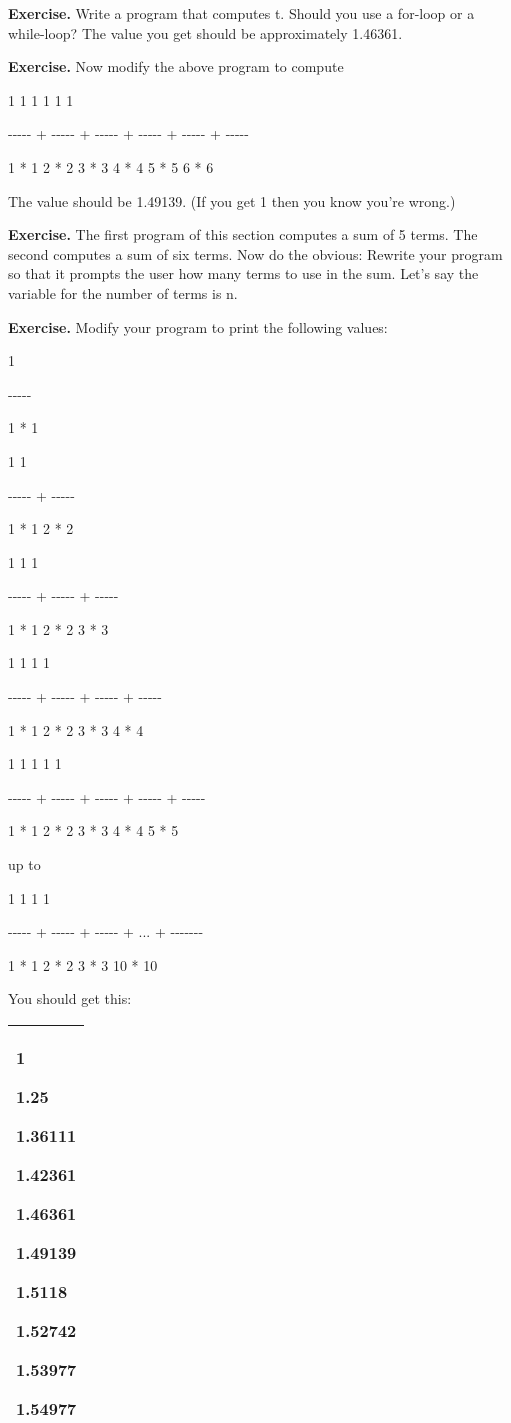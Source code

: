 \documentclass[
]{article}
\begin{document}
\textbf{Exercise.} Write a program that computes t. Should you use a
for-loop or a while-loop? The value you get should be approximately
1.46361.

\textbf{Exercise.} Now modify the above program to compute

1 1 1 1 1 1

-\/-\/-\/-\/- + -\/-\/-\/-\/- + -\/-\/-\/-\/- + -\/-\/-\/-\/- +
-\/-\/-\/-\/- + -\/-\/-\/-\/-

1 * 1 2 * 2 3 * 3 4 * 4 5 * 5 6 * 6

The value should be 1.49139. (If you get 1 then you know you're wrong.)

\textbf{Exercise.} The first program of this section computes a sum of 5
terms. The second computes a sum of six terms. Now do the obvious:
Rewrite your program so that it prompts the user how many terms to use
in the sum. Let's say the variable for the number of terms is n.

\textbf{Exercise.} Modify your program to print the following values:

1

-\/-\/-\/-\/-

1 * 1

1 1

-\/-\/-\/-\/- + -\/-\/-\/-\/-

1 * 1 2 * 2

1 1 1

-\/-\/-\/-\/- + -\/-\/-\/-\/- + -\/-\/-\/-\/-

1 * 1 2 * 2 3 * 3

1 1 1 1

-\/-\/-\/-\/- + -\/-\/-\/-\/- + -\/-\/-\/-\/- + -\/-\/-\/-\/-

1 * 1 2 * 2 3 * 3 4 * 4

1 1 1 1 1

-\/-\/-\/-\/- + -\/-\/-\/-\/- + -\/-\/-\/-\/- + -\/-\/-\/-\/- +
-\/-\/-\/-\/-

1 * 1 2 * 2 3 * 3 4 * 4 5 * 5

up to

1 1 1 1

-\/-\/-\/-\/- + -\/-\/-\/-\/- + -\/-\/-\/-\/- + ... +
-\/-\/-\/-\/-\/-\/-

1 * 1 2 * 2 3 * 3 10 * 10

You should get this:

\begin{longtable}[]{@{}l@{}}
\toprule
\endhead
\begin{minipage}[t]{0.97\columnwidth}\raggedright
1

1.25

1.36111

1.42361

1.46361

1.49139

1.5118

1.52742

1.53977

1.54977\strut
\end{minipage}\tabularnewline
\bottomrule
\end{longtable}
\end{document}
